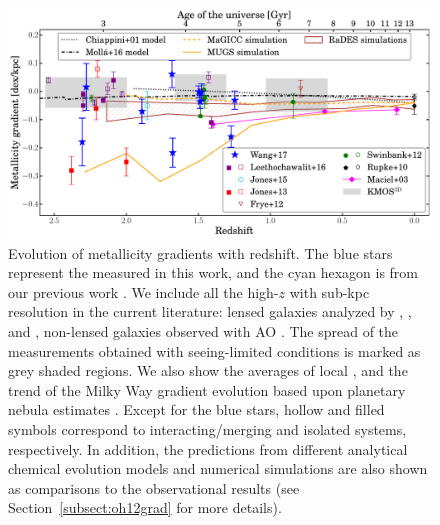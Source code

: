 \begin{figure}
    \centering
    \includegraphics[width=\textwidth]{fig/oh12gradVSz.pdf}
    \caption[Evolution of metallicity gradients with redshift.]
    {Evolution of metallicity gradients with redshift. The blue stars represent
    the \mgs measured in this work, and the cyan hexagon is from our previous work
    \citep{2015AJ....149..107J}. We include all the high-$z$ \mgms
    with sub-kpc resolution in the current literature: lensed galaxies analyzed by
    \citet{Frye:2012dr}, \citet{2013ApJ...765...48J}, and \citet{2015arXiv150901279L}, non-lensed
    galaxies observed with AO \citep{2012MNRAS.426..935S}.
    The spread of the \kd measurements obtained with seeing-limited conditions \citep{Wuyts:2016th} is marked as grey 
    shaded regions.
    We also show the averages of local \mgs \citep{Rupke:2010cg}, and the trend of the Milky Way gradient evolution based upon 
    planetary nebula estimates \citep{Maciel:2003kv}.
    Except for the blue stars, hollow and filled symbols correspond to interacting/merging
    and isolated systems, respectively.
    In addition, the predictions from different analytical chemical evolution models and
    numerical simulations are also shown as comparisons to the observational results (see
    Section~\ref{subsect:oh12grad} for more details).}
    \label{fig:oh12gradVSz}
\end{figure}

